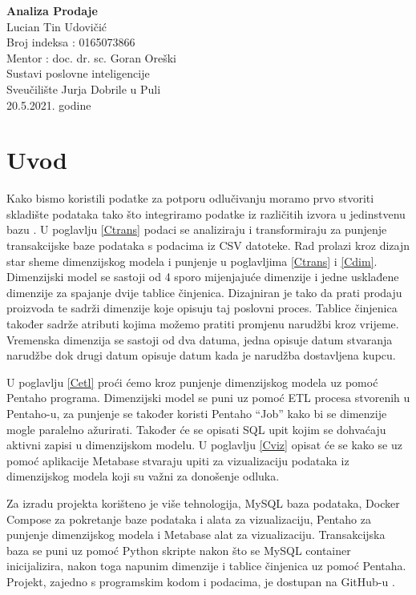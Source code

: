 \documentclass[12pt, oneside]{book}
\newcommand{\prored}{\vspace{12pt}}
\renewcommand{\maketitle}{
\begin{center}
    \hspace{0pt}
    \vfill
    \textbf{\LARGE Analiza Prodaje}\\
    \prored
    \prored
    \prored
    \prored
    Lucian Tin Udovičić\\
    Broj indeksa : 0165073866 \\
    Mentor :  doc. dr. sc. Goran Oreški \\
    Sustavi poslovne inteligencije     \\
    Sveučilište Jurja Dobrile u Puli\\
    20.5.2021. godine
    
    \vfill
    \hspace{0pt}
    
\end{center}
}\makeatother
\begin{document}
\pagestyle{plain} 
\maketitle
\clearpage

 
\tableofcontents


\clearpage
\mainmatter
{}

\chapter{Uvod}

\hspace{6mm}Kako bismo koristili podatke za potporu odlučivanju moramo prvo stvoriti skladište podataka tako što integriramo podatke iz različitih izvora u jedinstvenu bazu \cite{kimball2013data}. U poglavlju \ref{Ctrans} podaci se analiziraju i transformiraju za punjenje transakcijske baze podataka s podacima iz CSV datoteke. Rad prolazi kroz dizajn star sheme dimenzijskog modela i punjenje u poglavljima \ref{Ctrans}  i \ref{Cdim}.  Dimenzijski model se sastoji od 4 sporo mijenjajuće dimenzije i jedne usklađene dimenzije za spajanje dvije tablice činjenica. Dizajniran je tako da prati prodaju proizvoda te sadrži dimenzije koje opisuju taj poslovni proces. Tablice činjenica također sadrže atributi kojima možemo pratiti promjenu narudžbi kroz vrijeme. Vremenska dimenzija se sastoji od dva datuma, jedna opisuje datum stvaranja narudžbe dok drugi datum opisuje datum kada je narudžba dostavljena kupcu.  

\vspace{12pt}

U poglavlju \ref{Cetl} proći ćemo kroz punjenje dimenzijskog modela uz pomoć Pentaho programa. Dimenzijski model se puni uz pomoć ETL procesa stvorenih u Pentaho-u,  za punjenje se također koristi Pentaho “Job” kako bi se dimenzije mogle paralelno ažurirati.  Također će se opisati SQL upit kojim se dohvaćaju aktivni zapisi u dimenzijskom modelu. U poglavlju \ref{Cviz} opisat će se kako se uz pomoć aplikacije Metabase stvaraju upiti za vizualizaciju podataka iz dimenzijskog modela koji su važni za donošenje odluka. 

\vspace{12pt}

Za izradu projekta korišteno je više tehnologija, MySQL baza podataka, Docker Compose \cite{a2021_dockercompose} za pokretanje baze podataka i alata za vizualizaciju, Pentaho za punjenje dimenzijskog modela i Metabase \cite{a2021_metabasemetabase} alat za vizualizaciju. Transakcijska baza se puni uz pomoć Python skripte nakon što se MySQL container inicijalizira, nakon toga napunim dimenzije i tablice činjenica uz pomoć Pentaha. Projekt, zajedno s programskim kodom i podacima, je dostupan na GitHub-u \cite{a2021_luciantinfaksfaksspi}.
\end{document}
